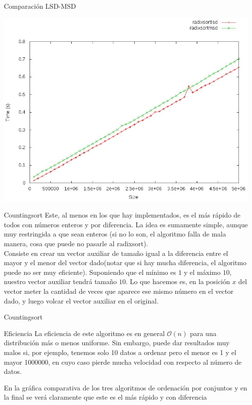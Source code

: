 \documentclass[compress]{beamer}
\begin{document}
\begin{frame}{Comparación LSD-MSD}
	\begin{alertblock}{}
		\begin{center}
		\includegraphics[scale=0.40]{images/radi-radi.jpeg}
		\end{center}
	\end{alertblock}
\end{frame}

\begin{frame}{Countingsort}
Este, al menos en los que hay implementados, es el más rápido de todos con números enteros y por diferencia. La idea es sumamente simple, aunque muy restringida a que sean enteros (si no lo son, el algoritmo falla de mala manera, cosa que puede no pasarle al radixsort).\\
\vspace{0.20in}
Consiste en crear un vector auxiliar de tamaño igual a la diferencia entre el mayor y el menor del vector dado(notar que si hay mucha diferencia, el algoritmo puede no ser muy eficiente). Suponiendo que el mínimo es $1$ y el máximo $10$, nuestro vector auxiliar tendrá tamaño $10$. Lo que hacemos es, en la posición $x$ del vector meter la cantidad de veces que aparece ese mismo número en el vector dado, y luego volcar el vector auxiliar en el original.
\end{frame}

\begin{frame}{Countingsort}
	\begin{block}{Eficiencia}
	La eficiencia de este algoritmo es en general $\mathcal{O}(n)$ para una distribución más o menos uniforme. Sin embargo, puede dar resultados muy malos si, por ejemplo, tenemos solo 10 datos a ordenar pero el menor es 1 y el mayor 1000000, en cuyo caso pierde mucha velocidad con respecto al número de datos.
	\end{block}
\vspace{0.20in}
En la gráfica comparativa de los tres algoritmos de ordenación por conjuntos y en la final se verá claramente que este es el más rápido y con diferencia
\end{frame}
\end{document}
